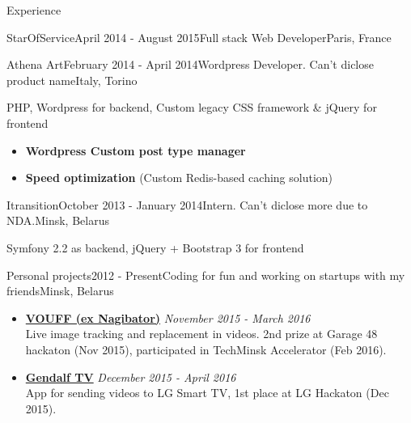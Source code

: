 \documentclass{resume} %
\begin{document}
\begin{rSection}{Experience}
\begin{rSubsection}{StarOfService}{April 2014 - August 2015}{Full stack Web Developer}{Paris, France}
\end{rSubsection}


\begin{rSubsection}{Athena Art}{February 2014 - April 2014}{Wordpress Developer. Can't diclose product name}{Italy, Torino}
\item PHP, Wordpress for backend, Custom legacy CSS framework \& jQuery for frontend


\begin{itemize}[leftmargin=*,label={$+$}]
  \item {\bf Wordpress Custom post type manager}
  \item {\bf Speed optimization} (Custom Redis-based caching solution)
\end{itemize}

\end{rSubsection}
\clearpage


\begin{rSubsection}{Itransition}{October 2013 - January 2014}{Intern. Can't diclose more due to NDA.}{Minsk, Belarus}
\item Symfony 2.2 as backend, jQuery + Bootstrap 3 for frontend
\end{rSubsection}


\begin{rSubsection}{Personal projects}{2012 - Present}{Coding for fun and working on startups with my friends}{Minsk, Belarus}

\begin{itemize}[leftmargin=*,label={$+$}]
  \item {\bf \href{http://nagibator.xyz}{VOUFF (ex Nagibator)}} \hfill {\em November 2015 - March 2016}  \\
	Live image tracking and replacement in videos. 2nd prize at Garage
	48 hackaton (Nov 2015), participated in TechMinsk Accelerator (Feb 2016).

  \item {\bf \href{http://gendalf.tv}{Gendalf TV}} \hfill {\em December 2015 - April 2016}  \\
	App for sending videos to LG Smart TV, 1st place at LG Hackaton (Dec 2015).


\end{itemize}
\end{rSubsection}
\end{rSection}
\end{document}

